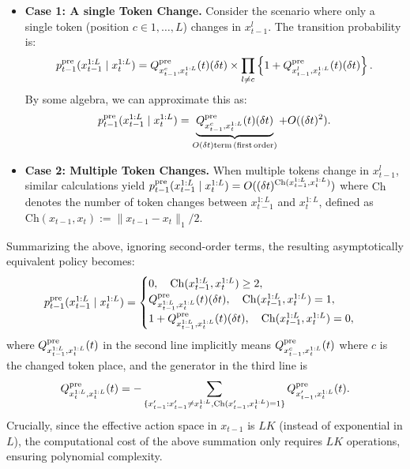 \begin{itemize}
    \item \textbf{Case 1: A single Token Change.} Consider the scenario where only a single token (position $c \in {1, \dots, L}$) changes in $x^l_{t-1}$. The transition probability is: 
\begin{align*}
     p^{\mathrm{pre}}_{t-1}(x^{1:L}_{t-1} \mid x^{1:L}_t)= Q^{\mathrm{pre}}_{x^c_{t-1}, x^{1:L}_{t} }(t) (\delta t)  \times \prod_{l \neq c} \left\{ 1 +Q^{\mathrm{pre}}_{x^l_{t-1}, x^{1:L}_{t} }(t) (\delta t)  \right \}. 
\end{align*}
By some algebra, we can approximate this as:
\begin{align*}
         p^{\mathrm{pre}}_{t-1}(x^{1:L}_{t-1} \mid x^{1:L}_t)=\underbrace{ Q^{\mathrm{pre}}_{x^c_{t-1}, x^{1:L}_{t} }(t)(\delta t)}_{O(\delta t)\mathrm{term\,(first\,order)} } + O((\delta t)^2). 
\end{align*}
\item \textbf{Case 2: Multiple Token Changes.}  When multiple tokens change in $x^l_{t-1}$, similar calculations yield $p^{\mathrm{pre}}_{t-1}(x^{1:L}_{t-1} \mid x^{1:L}_t)=O((\delta t)^{\mathrm{Ch}(x^{1:L}_{t-1},x^{1:L}_t)})$  where $\mathrm{Ch}$ denotes the number of token changes between  $x^{1:L}_{t-1}$ and $x^{1:L}_t$, defined as $\mathrm{Ch}(x_{t-1},x_t) := \|x_{t-1} - x_t\|_1 / 2$.
\end{itemize}

Summarizing the above, ignoring second-order terms, the resulting asymptotically equivalent policy becomes:
\begin{align}\label{eq:pre_trained_discrete}
    p^{\mathrm{pre}}_{t-1}(x^{1:L}_{t-1} \mid x^{1:L}_t)=\begin{cases}
       0, \quad  \mathrm{Ch}(x^{1:L}_{t-1},x^{1:L}_t) \geq   2,  \\
      Q^{\mathrm{pre}}_{x^{1:L}_{t-1},x^{1:L}_t}(t)  (\delta t),\quad  \mathrm{Ch}(x^{1:L}_{t-1},x^{1:L}_t) = 1,  \\ 
     1 +  Q^{\mathrm{pre}}_{x^{1:L}_{t-1},x^{1:L}_t}(t)(\delta t), \quad  \mathrm{Ch}(x^{1:L}_{t-1},x^{1:L}_t) = 0, 
    \end{cases}
\end{align}
where $ Q^{\mathrm{pre}}_{x^{1:L}_{t-1},x^{1:L}_t}(t)$ in the second line implicitly means $Q^{\mathrm{pre}}_{x^{c}_{t-1},x^{1:L}_t}(t)$ where $c$ is the changed token place, and the generator in the third line is 
$$ 
Q^{\mathrm{pre}}_{x^{1:L}_{t},x^{1:L}_t}(t) = -\sum_{\{ x'_{t-1}: x'_{t-1}\neq x^{1:L}_t, \mathrm{Ch}(x'_{t-1},x^{1:L}_t)=1 \} }  Q^{\mathrm{pre}}_{x'_{t-1},x^{1:L}_t}(t). 
$$
Crucially, since the effective action space in $x_{t-1}$ is $LK$ (instead of exponential in $L$), the computational cost of the above summation only requires $LK$ operations, ensuring polynomial complexity.

